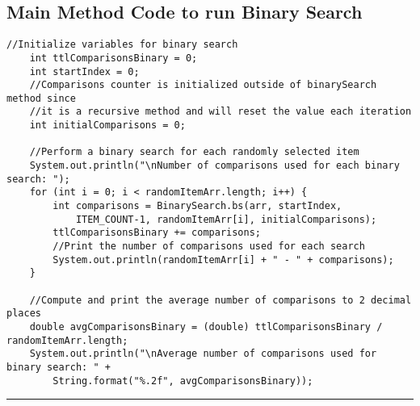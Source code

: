 \documentclass[letterpaper, 10pt,DIV=13]{scrartcl}
\numberwithin{equation}{section} %
\numberwithin{figure}{section} %
\numberwithin{table}{section} %
\newcommand{\horrule}[1]{\rule{\linewidth}{#1}} %
\begin{document}
\subsection{Main Method Code to run Binary Search}
\lstset{numbers=left, numberstyle=\tiny, stepnumber=1, numbersep=5pt, basicstyle=\footnotesize\ttfamily}
\begin{lstlisting}[frame=single, ] 
    //Initialize variables for binary search
    int ttlComparisonsBinary = 0;
    int startIndex = 0;
    //Comparisons counter is initialized outside of binarySearch method since 
    //it is a recursive method and will reset the value each iteration
    int initialComparisons = 0;

    //Perform a binary search for each randomly selected item
    System.out.println("\nNumber of comparisons used for each binary search: ");
    for (int i = 0; i < randomItemArr.length; i++) {
        int comparisons = BinarySearch.bs(arr, startIndex,
            ITEM_COUNT-1, randomItemArr[i], initialComparisons);
        ttlComparisonsBinary += comparisons;
        //Print the number of comparisons used for each search
        System.out.println(randomItemArr[i] + " - " + comparisons);
    }

    //Compute and print the average number of comparisons to 2 decimal places
    double avgComparisonsBinary = (double) ttlComparisonsBinary / randomItemArr.length;
    System.out.println("\nAverage number of comparisons used for binary search: " + 
        String.format("%.2f", avgComparisonsBinary));
\end{lstlisting}

\horrule{0pt}  	%
\end{document}
